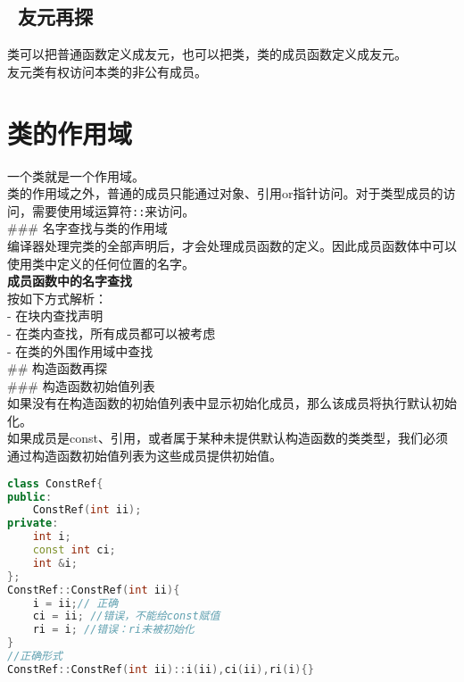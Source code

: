 \documentclass[
  a4paper,
  oneside,tablecaptionabove
]{scrbook}
\begin{document}
\subsection{~友元再探}\label{ux53cbux5143ux518dux63a2}

类可以把普通函数定义成友元，也可以把类，类的成员函数定义成友元。\\
友元类有权访问本类的非公有成员。

\section{类的作用域}\label{ux7c7bux7684ux4f5cux7528ux57df}

一个类就是一个作用域。\\
类的作用域之外，普通的成员只能通过对象、引用or指针访问。对于类型成员的访问，需要使用域运算符\lstinline!::!来访问。\\
\#\#\# 名字查找与类的作用域\\
编译器处理完类的全部声明后，才会处理成员函数的定义。因此成员函数体中可以使用类中定义的任何位置的名字。\\
\textbf{成员函数中的名字查找}\\
按如下方式解析：\\
- 在块内查找声明\\
- 在类内查找，所有成员都可以被考虑\\
- 在类的外围作用域中查找\\
\#\# 构造函数再探\\
\#\#\# 构造函数初始值列表\\
如果没有在构造函数的初始值列表中显示初始化成员，那么该成员将执行默认初始化。\\
如果成员是const、引用，或者属于某种未提供默认构造函数的类类型，我们必须通过构造函数初始值列表为这些成员提供初始值。

\begin{lstlisting}[language={C++}]
class ConstRef{
public:
    ConstRef(int ii);
private:
    int i;
    const int ci;
    int &i;
};
ConstRef::ConstRef(int ii){
    i = ii;// 正确
    ci = ii; //错误，不能给const赋值
    ri = i; //错误：ri未被初始化
}
//正确形式
ConstRef::ConstRef(int ii)::i(ii),ci(ii),ri(i){}
\end{lstlisting}
\end{document}
